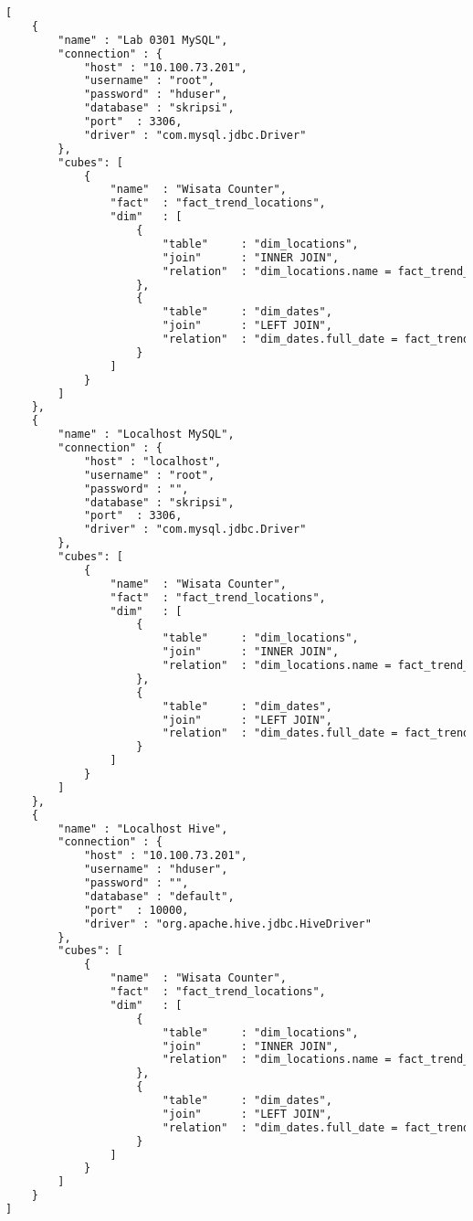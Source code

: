 \begin{lstlisting}[language=HTML,basicstyle=\tiny,caption=connections.json]
[
    {
        "name" : "Lab 0301 MySQL",
        "connection" : {
            "host" : "10.100.73.201",
            "username" : "root",
            "password" : "hduser",
            "database" : "skripsi",
            "port"  : 3306,
            "driver" : "com.mysql.jdbc.Driver"
        },
        "cubes": [
            {
                "name"  : "Wisata Counter",
                "fact"  : "fact_trend_locations",
                "dim"   : [
                    {
                        "table"     : "dim_locations",
                        "join"      : "INNER JOIN",
                        "relation"  : "dim_locations.name = fact_trend_locations.destination"
                    },
                    {
                        "table"     : "dim_dates",
                        "join"      : "LEFT JOIN",
                        "relation"  : "dim_dates.full_date = fact_trend_locations.post_date"
                    }
                ]
            }
        ]
    },
    {
        "name" : "Localhost MySQL",
        "connection" : {
            "host" : "localhost",
            "username" : "root",
            "password" : "",
            "database" : "skripsi",
            "port"  : 3306,
            "driver" : "com.mysql.jdbc.Driver"
        },
        "cubes": [
            {
                "name"  : "Wisata Counter",
                "fact"  : "fact_trend_locations",
                "dim"   : [
                    {
                        "table"     : "dim_locations",
                        "join"      : "INNER JOIN",
                        "relation"  : "dim_locations.name = fact_trend_locations.destination"
                    },
                    {
                        "table"     : "dim_dates",
                        "join"      : "LEFT JOIN",
                        "relation"  : "dim_dates.full_date = fact_trend_locations.post_date"
                    }
                ]
            }
        ]
    },
    {
        "name" : "Localhost Hive",
        "connection" : {
            "host" : "10.100.73.201",
            "username" : "hduser",
            "password" : "",
            "database" : "default",
            "port"  : 10000,
            "driver" : "org.apache.hive.jdbc.HiveDriver"
        },
        "cubes": [
            {
                "name"  : "Wisata Counter",
                "fact"  : "fact_trend_locations",
                "dim"   : [
                    {
                        "table"     : "dim_locations",
                        "join"      : "INNER JOIN",
                        "relation"  : "dim_locations.name = fact_trend_locations.destination"
                    },
                    {
                        "table"     : "dim_dates",
                        "join"      : "LEFT JOIN",
                        "relation"  : "dim_dates.full_date = fact_trend_locations.post_date"
                    }
                ]
            }
        ]
    }
]
\end{lstlisting}